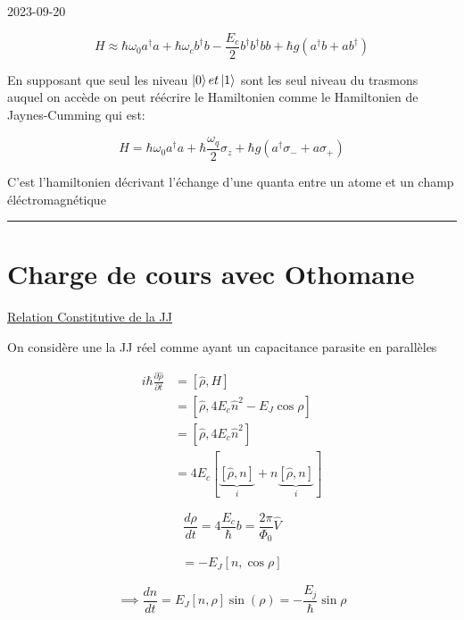 


2023-09-20

\[ \boxed{H \approx \hbar \omega_0 a^{\dagger}a +\hbar\omega_c b^{\dagger} b - \frac{E_c}{2} b^{\dagger}b^{\dagger}b b+ \hbar g \left( a^{\dagger} b + a b^{\dagger} \right)}   \]

En supposant que seul les niveau $\ket{0} et \ket{1}$ sont les seul niveau du trasmons auquel on accède on peut réécrire le Hamiltonien comme le Hamiltonien de Jaynes-Cumming qui est: 

\[ \boxed{H = \hbar \omega_0 a^{\dagger}a +\hbar \frac{\omega_q}{2}  \sigma_z + \hbar g \left( a^{\dagger} \sigma_-  + a \sigma_+ \right)}  \]


C'est l'hamiltonien décrivant l'échange d'une quanta entre un atome et un champ éléctromagnétique 

\vspace{1cm}
\hrule 

\section*{Charge de cours avec Othomane }



\underline{Relation Constitutive de la JJ} 

On considère une la JJ réel comme ayant un capacitance parasite en parallèles 

\begin{align*}
    i\hbar \frac{\partial {\hat \rho}}{\partial {t}}  &= [\hat\rho, H]\\
                                                      &= [\hat\rho, 4E_c \hat n^{2}- E_J \cos \rho]\\
                                                      &= [\hat \rho, 4 E_c \hat n^2]\\
                                                      &= 4 E_c \left[ \underbrace{[\hat\rho, n]}_{i}  + n \underbrace{[\hat\rho, n]}_{i}   \right] 
\end{align*}


\[ \frac{d {\rho}}{d {t}}= 4 \frac{E_c}{\hbar} b = \frac{2\pi}{\Phi_0} \hat V\]


\begin{align*}
    [n, H] = - E_J [n, \cos\rho] 
\end{align*}

\[ \implies \frac{d {n}}{d {t}} = E_J \left[ n, \rho \right] \sin(\rho) = - \frac{E_j}{\hbar} \sin \rho 
 \]



